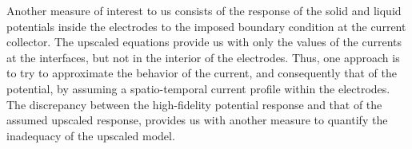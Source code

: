 Another measure of interest to us consists of the response of the solid and liquid potentials inside the electrodes to the imposed boundary condition at the current collector. The upscaled equations provide us with only the values of the currents at the interfaces, but not in the interior of the electrodes. Thus, one approach is to try to approximate the behavior of the current, and consequently that of the potential, by assuming a spatio-temporal current profile within the electrodes. The discrepancy between the high-fidelity potential response and that of the assumed upscaled response, provides us with another measure to quantify the inadequacy of the upscaled model.  


